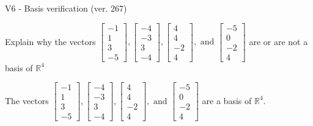 \begin{exercise}
  \begin{exerciseTitle}V6 - Basis verification (ver. 267)\end{exerciseTitle}
  \begin{exerciseStatement}
    Explain why the vectors \(\left[\begin{array}{r}
-1 \\
1 \\
3 \\
-5
\end{array}\right] , \left[\begin{array}{r}
-4 \\
-3 \\
3 \\
-4
\end{array}\right] , \left[\begin{array}{r}
4 \\
4 \\
-2 \\
4
\end{array}\right] , \text{ and } \left[\begin{array}{r}
-5 \\
0 \\
-2 \\
4
\end{array}\right]\) are or are not a basis of \(\mathbb{R}^4\)	


  \end{exerciseStatement}
  \begin{exerciseAnswer}
   The vectors \(\left[\begin{array}{r}
-1 \\
1 \\
3 \\
-5
\end{array}\right] , \left[\begin{array}{r}
-4 \\
-3 \\
3 \\
-4
\end{array}\right] , \left[\begin{array}{r}
4 \\
4 \\
-2 \\
4
\end{array}\right] , \text{ and } \left[\begin{array}{r}
-5 \\
0 \\
-2 \\
4
\end{array}\right]\) 
  	 are  a basis of \(\mathbb{R}^4\).
  


  \end{exerciseAnswer}
\end{exercise}